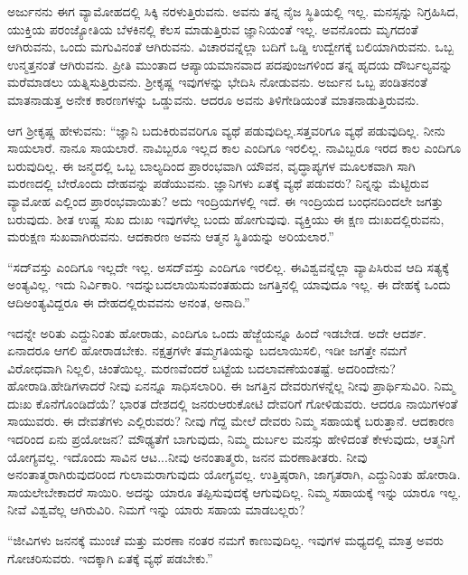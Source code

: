 ಅರ್ಜುನನು ಈಗ ವ್ಯಾಮೋಹದಲ್ಲಿ ಸಿಕ್ಕಿ ನರಳುತ್ತಿರುವನು. ಅವನು ತನ್ನ ನೈಜ ಸ್ಥಿತಿಯಲ್ಲಿ ಇಲ್ಲ. ಮನಸ್ಸನ್ನು ನಿಗ್ರಹಿಸಿದ, ಯುಕ್ತಿಯ ಪರಂಜ್ಯೋತಿಯ ಬೆಳಕಿನಲ್ಲಿ ಕೆಲಸ ಮಾಡುತ್ತಿರುವ ಜ್ಞಾನಿಯಂತೆ ಇಲ್ಲ. ಅವನೊಂದು ಮೃಗದಂತೆ ಆಗಿರುವನು, ಒಂದು ಮಗುವಿನಂತೆ ಆಗಿರುವನು. ವಿಚಾರವನ್ನೆಲ್ಲಾ ಬದಿಗೆ ಒಡ್ಡಿ ಉದ್ವೇಗಕ್ಕೆ ಬಲಿಯಾಗಿರುವನು. ಒಬ್ಬ ಉನ್ಮತ್ತನಂತೆ ಆಗಿರುವನು. ಪ್ರೀತಿ ಮುಂತಾದ ಆಪ್ಯಾಯಮಾನವಾದ ಪದಪುಂಜಗಳಿಂದ ತನ್ನ ಹೃದಯ ದೌರ್ಬಲ್ಯವನ್ನು ಮರೆಮಾಡಲು ಯತ್ನಿಸುತ್ತಿರುವನು. ಶ‍್ರೀಕೃಷ್ಣ ಇವುಗಳನ್ನು ಭೇದಿಸಿ ನೋಡುವನು. ಅರ್ಜುನ ಒಬ್ಬ ಪಂಡಿತನಂತೆ ಮಾತನಾಡುತ್ತ ಅನೇಕ ಕಾರಣಗಳನ್ನು ಒಡ್ಡುವನು. ಆದರೂ ಅವನು ತಿಳಿಗೇಡಿಯಂತೆ ಮಾತನಾಡುತ್ತಿರುವನು.

ಆಗ ಶ‍್ರೀಕೃಷ್ಣ ಹೇಳುವನು: “ಜ್ಞಾನಿ ಬದುಕಿರುವವರಿಗೂ ವ್ಯಥೆ ಪಡುವುದಿಲ್ಲ.\break ಸತ್ತವರಿಗೂ ವ್ಯಥೆ ಪಡುವುದಿಲ್ಲ.  ನೀನು ಸಾಯಲಾರೆ. ನಾನೂ ಸಾಯಲಾರೆ. ನಾವಿಬ್ಬರೂ ಇಲ್ಲದ ಕಾಲ ಎಂದಿಗೂ ಇರಲಿಲ್ಲ. ನಾವಿಬ್ಬರೂ ಇರದ ಕಾಲ ಎಂದಿಗೂ ಬರುವುದಿಲ್ಲ. ಈ ಜನ್ಮದಲ್ಲಿ ಒಬ್ಬ ಬಾಲ್ಯದಿಂದ ಪ್ರಾರಂಭವಾಗಿ ಯೌವನ, ವೃದ್ಧಾಪ್ಯಗಳ ಮೂಲಕವಾಗಿ ಸಾಗಿ ಮರಣದಲ್ಲಿ ಬೇರೊಂದು ದೇಹವನ್ನು ಪಡೆಯುವನು. ಜ್ಞಾನಿಗಳು ಏತಕ್ಕೆ ವ್ಯಥೆ ಪಡುವರು?  ನಿನ್ನನ್ನು ಮೆಟ್ಟಿರುವ ವ್ಯಾಮೋಹ ಎಲ್ಲಿಂದ ಪ್ರಾರಂಭವಾಯಿತು? ಅದು ಇಂದ್ರಿಯಗಳಲ್ಲಿ ಇದೆ. ಈ ಇಂದ್ರಿಯದ ಬಂಧನದಿಂದಲೇ ಜಗತ್ತು ಬರುವುದು. ಶೀತ ಉಷ್ಣ ಸುಖ ದುಃಖ ಇವುಗಳೆಲ್ಲ ಬಂದು ಹೋಗುವುವು.  ವ್ಯಕ್ತಿಯು ಈ ಕ್ಷಣ ದುಃಖದಲ್ಲಿರುವನು, ಮರುಕ್ಷಣ ಸುಖವಾಗಿರುವನು. ಆದಕಾರಣ ಅವನು ಆತ್ಮನ ಸ್ಥಿತಿಯನ್ನು ಅರಿಯಲಾರ.”

“ಸದ್​ವಸ್ತು ಎಂದಿಗೂ ಇಲ್ಲದೇ ಇಲ್ಲ. ಅಸದ್​ವಸ್ತು ಎಂದಿಗೂ ಇರಲಿಲ್ಲ. ಈ\break ವಿಶ್ವವನ್ನೆಲ್ಲಾ ವ್ಯಾಪಿಸಿರುವ ಆದಿ ಸತ್ಯಕ್ಕೆ ಅಂತ್ಯವಿಲ್ಲ. ಇದು ನಿರ್ವಿಕಾರಿ. ಇದನ್ನು\break ಬದಲಾಯಿಸುವಂತಹುದು ಜಗತ್ತಿನಲ್ಲಿ ಯಾವುದೂ ಇಲ್ಲ. ಈ ದೇಹಕ್ಕೆ ಒಂದು ಆದಿ\break ಅಂತ್ಯವಿದ್ದರೂ ಈ ದೇಹದಲ್ಲಿರುವವನು ಅನಂತ, ಅನಾದಿ.” 

ಇದನ್ನೇ ಅರಿತು ಎದ್ದುನಿಂತು ಹೋರಾಡು, ಎಂದಿಗೂ ಒಂದು ಹೆಜ್ಜೆಯನ್ನೂ ಹಿಂದೆ ಇಡಬೇಡ. ಅದೇ ಆದರ್ಶ. ಏನಾದರೂ ಆಗಲಿ ಹೋರಾಡಬೇಕು. ನಕ್ಷತ್ರಗಳೇ ತಮ್ಮ\break ಗತಿಯನ್ನು ಬದಲಾಯಿಸಲಿ, ಇಡೀ ಜಗತ್ತೇ ನಮಗೆ ವಿರೋಧವಾಗಿ ನಿಲ್ಲಲಿ, ಚಿಂತೆಯಿಲ್ಲ. ಮರಣವೆಂದರೆ ಬಟ್ಟೆಯ ಬದಲಾವಣೆಯಂತಷ್ಟೆ. ಅದರಿಂದೇನು? ಹೋರಾಡಿ.\break ಹೇಡಿಗಳಾದರೆ ನೀವು ಏನನ್ನೂ ಸಾಧಿಸಲಾರಿರಿ. ಈ ಜಗತ್ತಿನ ದೇವರುಗಳನ್ನೆಲ್ಲ ನೀವು ಪ್ರಾರ್ಥಿಸುವಿರಿ. ನಿಮ್ಮ ದುಃಖ ಕೊನೆಗೊಂಡಿದೆಯೆ? ಭಾರತ ದೇಶದಲ್ಲಿ ಜನರು\break ಆರುಕೋಟಿ ದೇವರಿಗೆ ಗೋಳಿಡುವರು. ಆದರೂ ನಾಯಿಗಳಂತೆ ಸಾಯುವರು. ಈ ದೇವತೆಗಳು ಎಲ್ಲಿರುವರು? ನೀವು ಗೆದ್ದ ಮೇಲೆ ದೇವರು ನಿಮ್ಮ ಸಹಾಯಕ್ಕೆ ಬರುತ್ತಾನೆ. ಆದಕಾರಣ ಇದರಿಂದ ಏನು ಪ್ರಯೋಜನ? ಮೌಢ್ಯತೆಗೆ ಬಾಗುವುದು, ನಿಮ್ಮ ದುರ್ಬಲ ಮನಸ್ಸು ಹೇಳಿದಂತೆ ಕೇಳುವುದು, ಆತ್ಮನಿಗೆ ಯೋಗ್ಯವಲ್ಲ. ಇದೊಂದು ಸಾವಿನ ಆಟ...ನೀವು ಅನಂತಾತ್ಮರು, ಜನನ ಮರಣಾತೀತರು. ನೀವು ಅನಂತಾತ್ಮರಾಗಿರುವುದರಿಂದ ಗುಲಾಮರಾಗುವುದು ಯೋಗ್ಯವಲ್ಲ. ಉತ್ತಿಷ್ಠರಾಗಿ, ಜಾಗೃತರಾಗಿ, ಎದ್ದುನಿಂತು ಹೋರಾಡಿ. ಸಾಯಲೇಬೇಕಾದರೆ ಸಾಯಿರಿ. ಅದನ್ನು ಯಾರೂ ತಪ್ಪಿಸುವುದಕ್ಕೆ ಆಗುವುದಿಲ್ಲ. ನಿಮ್ಮ ಸಹಾಯಕ್ಕೆ ಇನ್ನು ಯಾರೂ ಇಲ್ಲ. ನೀವೆ ವಿಶ್ವವೆಲ್ಲ ಆಗಿರುವಿರಿ. ನಿಮಗೆ ಇನ್ನು ಯಾರು ಸಹಾಯ ಮಾಡಬಲ್ಲರು?

“ಜೀವಿಗಳು ಜನನಕ್ಕೆ ಮುಂಚೆ ಮತ್ತು ಮರಣಾ ನಂತರ ನಮಗೆ ಕಾಣುವುದಿಲ್ಲ. ಇವುಗಳ ಮಧ್ಯದಲ್ಲಿ ಮಾತ್ರ ಅವರು ಗೋಚರಿಸುವರು. ಇದಕ್ಕಾಗಿ ಏತಕ್ಕೆ ವ್ಯಥೆ ಪಡಬೇಕು.” 

